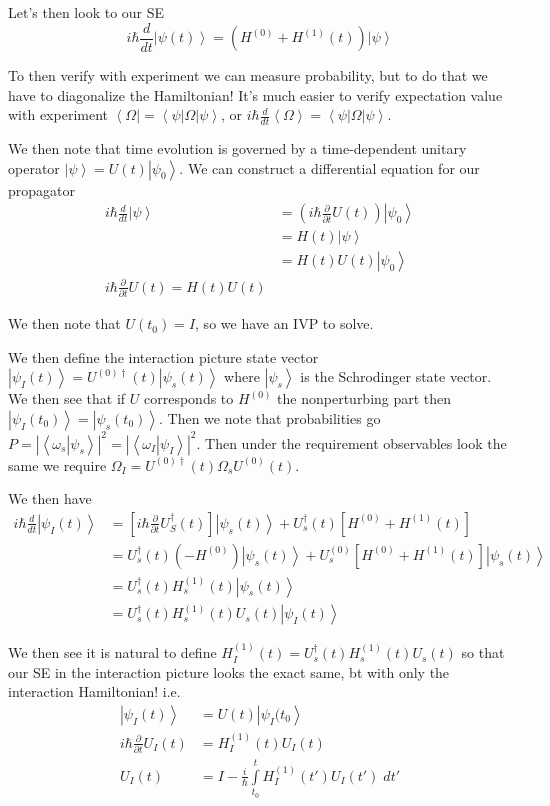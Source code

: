 \documentclass[10pt]{report}
\newcommand{\bra}[1]{\left<#1\right|}
\newcommand{\ket}[1]{\left|#1\right>}
\newcommand{\dotp}[2]{\left<#1\left.\right|#2\right>}
\newcommand{\rd}[2]{\frac{d#1}{d#2}}
\newcommand{\pd}[2]{\frac{\partial #1}{\partial#2}}
\newcommand{\abs}[1]{\left|#1\right|}
\newcommand{\expvalue}[1]{\left<#1\right>}
\begin{document}
Let's then look to our SE
\begin{equation}
    i\hbar \rd{}{t}\ket{\psi(t)} = \left( H^{(0)} + H^{(1)}(t) \right)\ket{\psi}
    \label{2.3.pert}
\end{equation}

To then verify with experiment we can measure probability, but to do that we have to diagonalize the Hamiltonian! It's much easier to verify expectation value with experiment $\bra{\Omega} = \bra{\psi}\Omega\ket{\psi}$, or $i\hbar \rd{}{t}\expvalue{\Omega} = \bra{\psi}\Omega\ket{\psi}$.

We then note that time evolution is governed by a time-dependent unitary operator $\ket{\psi} = U(t) \ket{\psi_0}$. We can construct a differential equation for our propagator
\begin{align}
    i\hbar \rd{}{t}\ket{\psi} &= \left( i\hbar \pd{}{t} U(t) \right)\ket{\psi_0}\\
    &= H(t)\ket{\psi}\\
    &= H(t) U(t) \ket{\psi_0}\\
    i\hbar \pd{}{t}U(t) = H(t) U(t)
\end{align}

We then note that $U(t_0) = I$, so we have an IVP to solve.

We then define the interaction picture state vector $\ket{\psi_I(t)} = U^{(0)\dagger}(t) \ket{\psi_s(t)}$ where $\ket{\psi_s}$ is the Schrodinger state vector. We then see that if $U$ corresponds to $H^{(0)}$ the nonperturbing part then $\ket{\psi_I(t_0)} = \ket{\psi_s(t_0)}$. Then we note that probabilities go $P = \abs{\dotp{\omega_s}{\psi_s}}^2 = \abs{\dotp{\omega_I}{\psi_I}}^2$. Then under the requirement observables look the same we require $\Omega_I = U^{(0)\dagger}(t) \Omega_sU^{(0)}(t)$. 

We then have
\begin{align}
    i\hbar \rd{}{t}\ket{\psi_I(t)} &= \left[ i\hbar \pd{}{t}U_S^\dagger(t) \right]\ket{\psi_s(t)} + U_s^\dagger(t) \left[ H^{(0)} + H^{(1)}(t) \right]\\
    &= U_s^\dagger(t)\left( -H^{(0)} \right)\ket{\psi_s(t)} + U_s^{(0)}\left[ H^{(0)} + H^{(1)}(t) \right] \ket{\psi_s(t)}\\
    &= U_s^\dagger(t)H_s^{(1)}(t)\ket{\psi_s(t)}\\
    &= U_s^\dagger(t)H_s^{(1)}(t)U_s(t)\ket{\psi_I(t)}
\end{align}

We then see it is natural to define $H_I^{(1)}(t) = U_s^\dagger(t)H_s^{(1)}(t)U_s(t)$ so that our SE in the interaction picture looks the exact same, bt with only the interaction Hamiltonian! i.e.
\begin{align}
    \ket{\psi_I(t)} &= U(t) \ket{\psi_I(t_0}\\
    i\hbar \pd{}{t}U_I(t) &= H_I^{(1)}(t) U_I(t)\\
    U_I(t) &= I - \frac{i}{\hbar}\displaystyle\int\limits_{t_0}^{t}H_I^{(1)}(t') U_I(t')\;dt'
\end{align}
\end{document}
